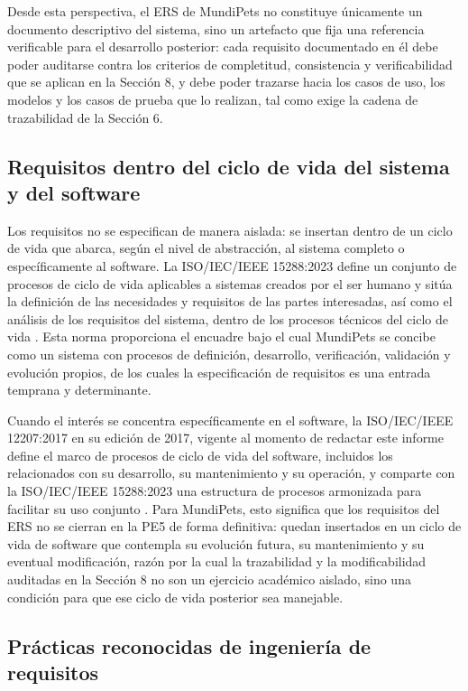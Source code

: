 \documentclass[journal,onecolumn]{IEEEtran}
\begin{document}
Desde esta perspectiva, el ERS de MundiPets no constituye únicamente un documento descriptivo del
sistema, sino un artefacto que fija una referencia verificable para el desarrollo posterior: cada
requisito documentado en él debe poder auditarse contra los criterios de completitud, consistencia y
verificabilidad que se aplican en la Sección 8, y debe poder trazarse hacia los casos de uso, los
modelos y los casos de prueba que lo realizan, tal como exige la cadena de trazabilidad de la
Sección 6.

\subsection{Requisitos dentro del ciclo de vida del sistema y del software}

Los requisitos no se especifican de manera aislada: se insertan dentro de un ciclo de vida que
abarca, según el nivel de abstracción, al sistema completo o específicamente al software. La
ISO/IEC/IEEE 15288:2023 define un conjunto de procesos de ciclo de vida aplicables a sistemas creados
por el ser humano y sitúa la definición de las necesidades y requisitos de las partes interesadas, así
como el análisis de los requisitos del sistema, dentro de los procesos técnicos del ciclo de vida
\cite{iso15288}. Esta norma proporciona el encuadre bajo el cual MundiPets se concibe como un sistema
con procesos de definición, desarrollo, verificación, validación y evolución propios, de los cuales la
especificación de requisitos es una entrada temprana y determinante.

Cuando el interés se concentra específicamente en el software, la ISO/IEC/IEEE 12207:2017 en su
edición de 2017, vigente al momento de redactar este informe define el marco de procesos de ciclo
de vida del software, incluidos los relacionados con su desarrollo, su mantenimiento y su operación, y
comparte con la ISO/IEC/IEEE 15288:2023 una estructura de procesos armonizada para facilitar su uso
conjunto \cite{iso12207}. Para MundiPets, esto significa que los requisitos del ERS no se cierran en la
PE5 de forma definitiva: quedan insertados en un ciclo de vida de software que contempla su evolución
futura, su mantenimiento y su eventual modificación, razón por la cual la trazabilidad y la
modificabilidad auditadas en la Sección 8 no son un ejercicio académico aislado, sino una condición
para que ese ciclo de vida posterior sea manejable.

\subsection{Prácticas reconocidas de ingeniería de requisitos}
\end{document}
